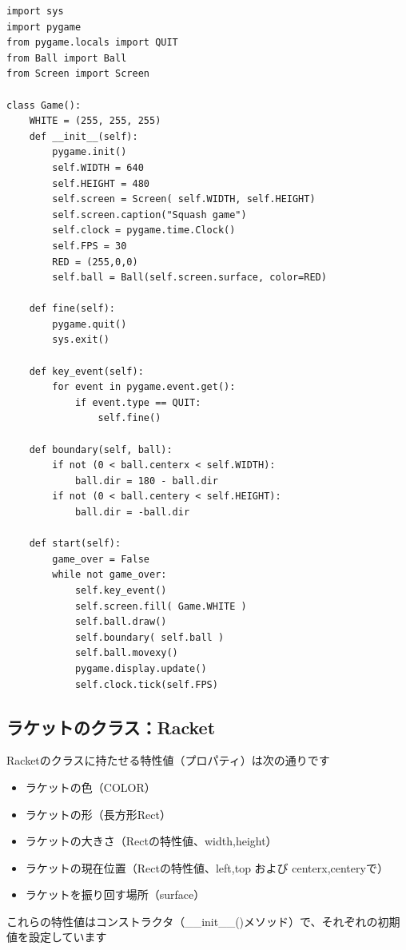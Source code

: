 \documentclass[uplatex,a4paper,11pt,oneside,openany]{jsbook}
\begin{document}
\begin{lstlisting}[caption=Gameクラス（ballオブジェクトを追加）,label=p1]
import sys
import pygame
from pygame.locals import QUIT
from Ball import Ball
from Screen import Screen

class Game():
    WHITE = (255, 255, 255)
    def __init__(self):
        pygame.init()
        self.WIDTH = 640
        self.HEIGHT = 480
        self.screen = Screen( self.WIDTH, self.HEIGHT)
        self.screen.caption("Squash game")
        self.clock = pygame.time.Clock()
        self.FPS = 30
        RED = (255,0,0)
        self.ball = Ball(self.screen.surface, color=RED)

    def fine(self):
        pygame.quit()
        sys.exit()

    def key_event(self):
        for event in pygame.event.get():
            if event.type == QUIT:
                self.fine()

    def boundary(self, ball):
        if not (0 < ball.centerx < self.WIDTH):
            ball.dir = 180 - ball.dir
        if not (0 < ball.centery < self.HEIGHT):
            ball.dir = -ball.dir

    def start(self):
        game_over = False
        while not game_over:
            self.key_event()
            self.screen.fill( Game.WHITE )
            self.ball.draw()
            self.boundary( self.ball )
            self.ball.movexy()
            pygame.display.update()
            self.clock.tick(self.FPS)
\end{lstlisting}

\subsection{ラケットのクラス：Racket}

Racketのクラスに持たせる特性値（プロパティ）は次の通りです

\begin{itemize}
  \item ラケットの色（COLOR）
  \item ラケットの形（長方形Rect）
  \item ラケットの大きさ（Rectの特性値、width,height）
  \item ラケットの現在位置（Rectの特性値、left,top および centerx,centeryで）
  \item ラケットを振り回す場所（surface）
\end{itemize}

これらの特性値はコンストラクタ（\_\_init\_\_()メソッド）で、それぞれの初期値を設定しています
\end{document}
